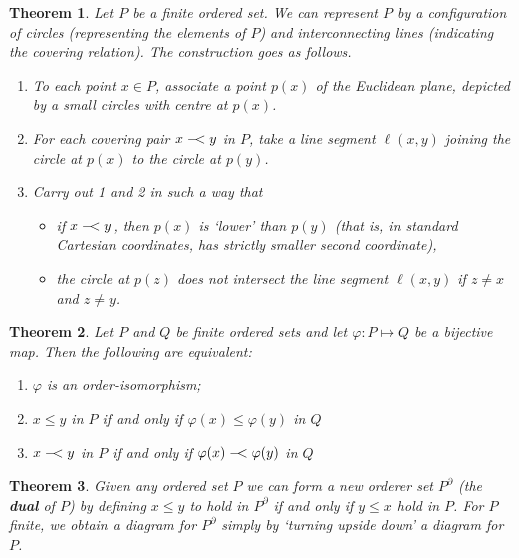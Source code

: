 \documentclass[a4paper,12pt,oneside]{report}%
\newcommand{\coveringA}{%
  \mathrel{-\mkern-4mu}<%
}
\newtheorem{theorem}{Theorem}
\begin{document}
\begin{theorem}
Let $P$ be a finite ordered set. We can represent $P$ by a configuration of
    circles (representing the elements of $P$) and interconnecting lines
    (indicating the covering relation). The construction goes as follows.
    \begin{enumerate}
        \item To each point $x \in P$, associate a point $p(x)$ of the Euclidean
            plane, depicted by a small circles with centre at $p(x)$.
        \item For each covering pair $x \coveringA y$ in $P$, take a line
            segment $\ell(x, y)$ joining the circle at $p(x)$ to the circle at
            $p(y)$.
        \item Carry out 1 and 2 in such a way that
            \begin{itemize}
                \item if $x \coveringA y$, then $p(x)$ is `lower' than $p(y)$
                    (that is, in standard Cartesian coordinates, has strictly
                    smaller second coordinate),
                \item the circle at $p(z)$ does not intersect the line segment
                    $\ell(x,y)$ if $z \ne x$ and $z \ne y$.
            \end{itemize}
    \end{enumerate}
\end{theorem}

\begin{theorem}
Let $P$ and $Q$ be finite ordered sets and let $\varphi: P \mapsto Q$ be a
    bijective map.
Then the following are equivalent:
    \begin{enumerate}
        \item $\varphi$ is an order-isomorphism;
        \item $x \le y$ in $P$  if and only  if $\varphi(x) \le \varphi(y)$ in
            $Q$
        \item $x \coveringA y$ in $P$ if and only if
            $\varphi(x) \coveringA \varphi(y)$ in $Q$
    \end{enumerate}
\end{theorem}

\begin{theorem}
Given any ordered set $P$ we can form a new orderer set $P^{\partial}$ (the
    \textbf{dual} of $P$) by defining $x \leq y$ to hold in $P^{\partial}$ if
    and only if $y \leq x$ hold in $P$.
For $P$ finite, we obtain a diagram for $P^{\partial}$ simply by
    `turning upside down' a diagram for $P$.
\end{theorem}
\end{document}
